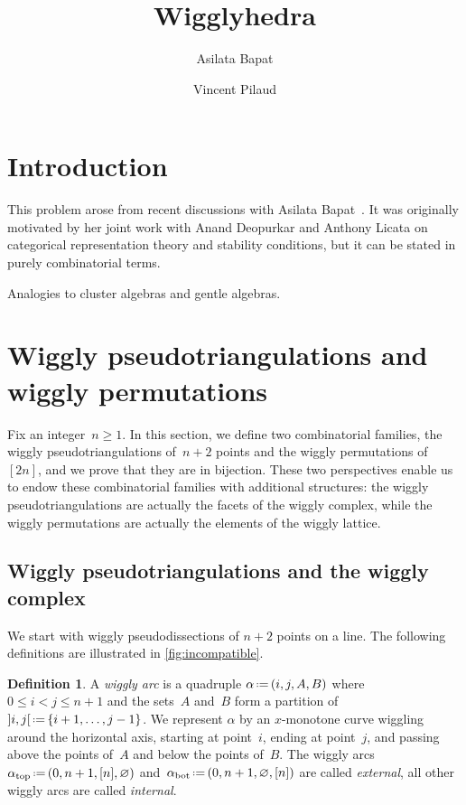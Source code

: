 \documentclass{amsart}
\title{Wigglyhedra}
\author{Asilata Bapat}
\author{Vincent Pilaud}
\theoremstyle{definition}
\newtheorem{definition}[theorem]{Definition}
\newcommand{\eqdef}{\mbox{\,\raisebox{0.2ex}{\scriptsize\ensuremath{\mathrm:}}\ensuremath{=}\,}} %
\newcommand{\darkblue}{\color{darkblue}} %
\newcommand{\defn}[1]{\textsl{\darkblue #1}} %
\begin{document}
\begin{abstract}
\end{abstract}

\maketitle

\tableofcontents


\section{Introduction}

This problem arose from recent discussions with Asilata Bapat~\cite{BapatPilaud}.
It was originally motivated by her joint work with Anand Deopurkar and Anthony Licata on categorical representation theory and stability conditions, but it can be stated in purely combinatorial terms.

Analogies to cluster algebras and gentle algebras.


\newpage
\section{Wiggly pseudotriangulations and wiggly permutations}
\label{sec:combinatorics}

Fix an integer~$n \ge 1$.
In this section, we define two combinatorial families, the wiggly pseudotriangulations of~$n+2$ points and the wiggly permutations of~$[2n]$, and we prove that they are in bijection.
These two perspectives enable us to endow these combinatorial families with additional structures: the wiggly pseudotriangulations are actually the facets of the wiggly complex, while the wiggly permutations are actually the elements of the wiggly lattice.


\subsection{Wiggly pseudotriangulations and the wiggly complex}
\label{subsec:wigglyPseudotriangulations}

We start with wiggly pseudodissections of $n+2$ points on a line.
The following definitions are illustrated in \cref{fig:incompatible}.

\begin{definition}
A \defn{wiggly arc} is a quadruple $\alpha \eqdef (i,j,A,B)$ where $0 \le i < j \le n+1$ and the sets~$A$ and~$B$ form a partition of~${]i,j[} \eqdef \{i+1, \dots, j-1\}$.
We represent $\alpha$ by an $x$-monotone curve wiggling around the horizontal axis, starting at point~$i$, ending at point~$j$, and passing above the points of~$A$ and below the points of~$B$.
The wiggly arcs~$\alpha_\mathrm{top} \eqdef (0, n+1, [n], \varnothing)$ and~$\alpha_\mathrm{bot} \eqdef (0, n+1, \varnothing, [n])$ are called \defn{external}, all other wiggly arcs are called \defn{internal}.
\end{definition}
\end{document}
